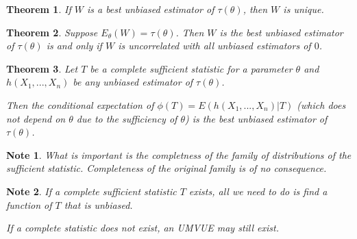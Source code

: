 \documentclass[14pt,twoside]{extreport}
\theoremstyle{dotless}
\newtheorem*{thm}{\footnotesize Theorem} %
\newtheorem*{note}{\footnotesize Note} %
\begin{document}
\begin{thm}
    If $W$ is a best unbiased estimator of $\tau(\theta)$, then $W$ is unique.
\end{thm}

\begin{thm}
    Suppose $E_\theta(W) = \tau(\theta)$. Then $W$ is the best unbiased estimator of $\tau(\theta)$ is and only if $W$ is uncorrelated with all unbiased estimators of $0$.
\end{thm}

\begin{thm}
    Let $T$ be a complete sufficient statistic for a parameter $\theta$ and $h(X_1, ..., X_n)$ be any unbiased estimator of $\tau(\theta)$. 

    Then the conditional expectation of $\phi(T) = E(h(X_1, ..., X_n)|T)$ (which does not depend on $\theta$ due to the sufficiency of $\theta$) is the best unbiased estimator of $\tau(\theta)$.
\end{thm}

\begin{note}
    What is important is the completness of the family of distributions of the sufficient statistic. Completeness of the original family is of no consequence.
\end{note}

\begin{note}
    If a complete sufficient statistic $T$ exists, all we need to do is find a function of $T$ that is unbiased. 

    If a complete statistic does not exist, an UMVUE may still exist.
\end{note}
\end{document}
